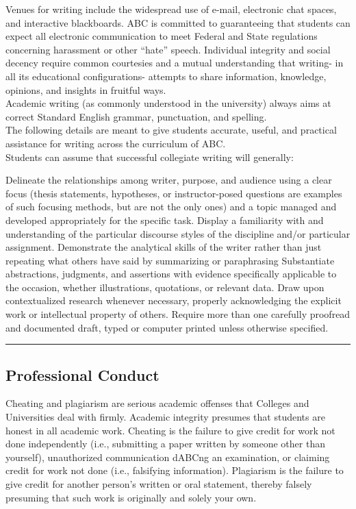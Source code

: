 Venues for writing include the widespread use of e-mail, electronic chat spaces, and interactive blackboards.  ABC is committed to guaranteeing that students can expect all electronic communication to meet Federal and State regulations concerning harassment or other ``hate'' speech. Individual integrity and social decency require common courtesies and a mutual understanding that writing- in all its educational configurations- attempts to share information, knowledge, opinions, and insights in fruitful ways. \\

Academic writing (as commonly understood in the university) always aims at correct Standard English grammar, punctuation, and spelling.\\

The following details are meant to give students accurate, useful, and practical assistance for writing across the curriculum of ABC.  \\

Students can assume that successful collegiate writing will generally:  
\begin{outline}
	\1	Delineate the relationships among writer, purpose, and audience using a clear focus (thesis statements, hypotheses, or instructor-posed questions are examples of such focusing methods, but are not the only ones) and a topic managed and developed appropriately for the specific task. 
	\1	Display a familiarity with and understanding of the particular discourse styles of the discipline and/or particular assignment.
	\1	Demonstrate the analytical skills of the writer rather than just repeating what others have said by summarizing or paraphrasing
	\1	Substantiate abstractions, judgments, and assertions with evidence specifically applicable to the occasion, whether illustrations, quotations, or relevant data.
	\1	Draw upon contextualized research whenever necessary, properly acknowledging the explicit work or intellectual property of others.
	\1	Require more than one carefully proofread and documented draft, typed or computer printed unless otherwise specified.
\end{outline}

\vspace{2ex}\hrule\vspace{2ex}



\subsection*{Professional Conduct}
Cheating and plagiarism are serious academic offenses that Colleges and Universities deal with firmly. Academic integrity presumes that students are honest in all academic work. Cheating is the failure to give credit for work not done independently (i.e., submitting a paper written by someone other than yourself), unauthorized communication dABCng an examination, or claiming credit for work not done (i.e., falsifying information). Plagiarism is the failure to give credit for another person’s written or oral statement, thereby falsely presuming that such work is originally and solely your own. \\ 

